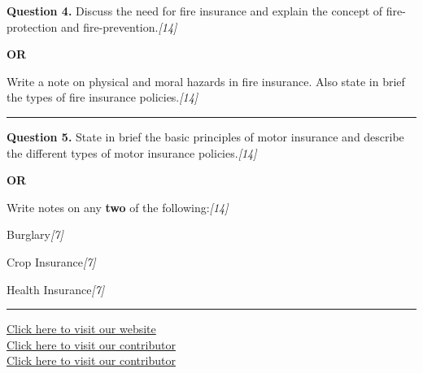 \documentclass[11pt,a4paper]{article}
\newcommand{\pts}[1]{\hfill   \textit{[#1]}}
\begin{document}
\noindent   \textbf{Question 4.}
Discuss the need for fire insurance and explain the concept of fire-protection and fire-prevention.\pts{14}

\centerline{   \textbf{OR}}

Write a note on physical and moral hazards in fire insurance. Also state in brief the types of fire insurance policies.\pts{14}

\medskip\rule{\linewidth}{0.2pt}




\noindent   \textbf{Question 5.}
State in brief the basic principles of motor insurance and describe the different types of motor insurance policies.\pts{14}

\centerline{   \textbf{OR}}

Write notes on any   \textbf{two} of the following:\pts{14}

\begin{parts}
  \item Burglary\pts{7}
  \item Crop Insurance\pts{7}
  \item Health Insurance\pts{7}
\end{parts}

\vfill
\rule{\linewidth}{0.4pt}

\begin{center}\small
\href{https://bhu-exam.vercel.app/}{Click here to visit our website}\\[4pt]
\href{https://me-aryan.vercel.app/}{Click here to visit our contributor}\\[4pt]
\href{https://quashan-me.vercel.app/}{Click here to visit our contributor}
\end{center}
\end{document}
